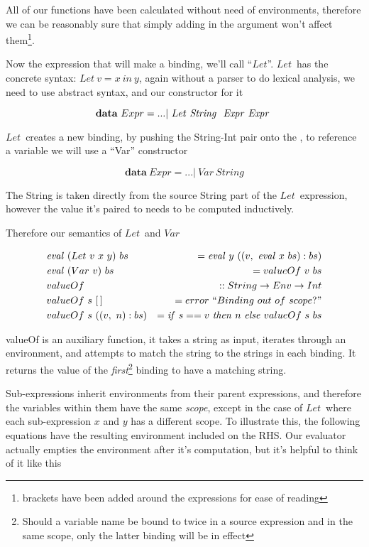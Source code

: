 \documentclass {article}
\begin{document}
All of our functions
have been calculated without need of environments,
therefore we can be reasonably sure that simply adding in the
\env argument won't affect them\footnote{
brackets have been added around the expressions for ease of reading}.

\newcommand{\lets}{$Let$}
\newcommand{\var}{$Var$}

Now the expression that will make a binding,
we'll call ``\lets''.
\lets\ has the concrete syntax:
\( Let\ v = x\ in\ y\),
again without a parser to do
lexical analysis, we need to use
abstract syntax, and our constructor
for it

	\[ \textbf{data}\ Expr = ... |\ Let\ \String\ \Expr \Expr \]

\lets\ creates a new binding,
by pushing the String-Int pair
onto the \env, to reference a variable we will
use a ``Var'' constructor

\[ \textbf{data}\ Expr = ... |\ Var\ String \]

The String is taken directly from the source
String part of the \lets\ expression,
however the value it's paired to 
needs to be computed inductively.

Therefore our semantics of \lets\ and \var\

\begin{eqnarray*}
&\evalf  (Let\ v\ x\ y)\ bs &= \evalf  y\ ((v,\ \evalf  x\ bs):bs) \\
&\evalf  (Var\ v)\ bs		    &=   valueOf\ v\ bs  \\
&valueOf\ &:: String \rightarrow Env \rightarrow Int \\
&valueOf\ s\ [\, ]\ &= error\ ``Binding\ out\ of\ scope?" \\
&valueOf\ s\ ((v,\ n):bs) &= \ifff s == v\ \tthen n\ \eelse valueOf\ s\ bs
\end{eqnarray*}

valueOf is an auxiliary function,
it takes a string as input, iterates through an
environment, and attempts to match
the string to the strings in each binding.
It returns the value of the \emph{first}\footnote{
Should a variable name be bound to twice in a 
source expression and in the same scope,
only the latter binding will
be in effect} binding
to have a matching string. 
\linebreak

Sub-expressions inherit environments from their parent expressions,
and therefore the variables within them have the same \emph{scope},
except in the case of \lets\ where each sub-expression $x$ and $y$
has a different scope. 
To illustrate this, the following equations
have the resulting environment included on the RHS.
Our evaluator actually empties the environment 
after it's computation, 
but it's helpful to think of it like this
\end{document}
